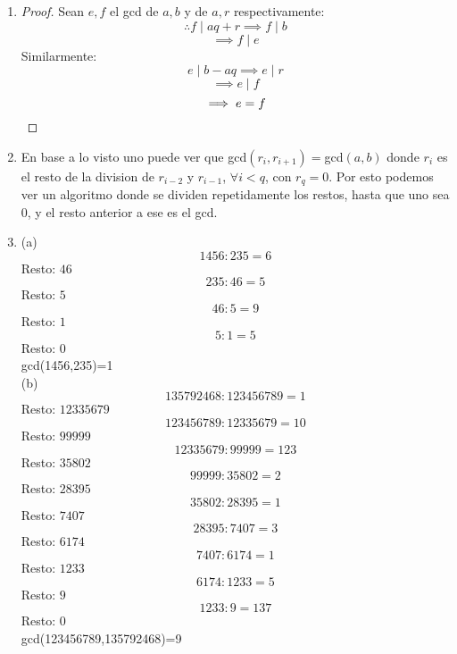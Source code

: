 \documentclass[11pt]{article}
\theoremstyle{definition}
\begin{document}
        \begin{enumerate}[label=\textbf{(\alph*)}]
            \item \begin{proof}
                Sean $e,f$ el gcd de $a,b$ y de $a,r$ respectivamente:
                \[\therefore f\mid aq+r\implies f\mid b\]
                \[\implies f\mid e\]
                Similarmente:
                \[e\mid b-aq\implies e\mid r\]
                \[\implies e\mid f\]
                \[\implies e=f\qedhere\]
            \end{proof}

            \item En base a lo visto uno puede ver que gcd$(r_i,r_{i+1})=$gcd$(a,b)$ donde $r_i$ es el resto de la division de $r_{i-2}$ y $r_{i-1}$, $\forall i< q$, con $r_q=0$. Por esto podemos ver un algoritmo donde se dividen repetidamente los restos, hasta que uno sea 0, y el resto anterior a ese es el gcd.

            \item
            (a)
            \[ 1456 : 235 = 6 \]
            Resto: $ 46 $
            \[ 235 : 46 = 5 \]
            Resto: $ 5 $
            \[ 46 : 5 = 9 \]
            Resto: $ 1 $
            \[ 5 : 1 = 5 \]
            Resto: $ 0 $\\
            gcd(1456,235)=1\\
            (b)
            \[ 135792468 : 123456789 = 1 \]
            Resto: $ 12335679 $
            \[ 123456789 : 12335679 = 10 \]
            Resto: $ 99999 $
            \[ 12335679 : 99999 = 123 \]
            Resto: $ 35802 $
            \[ 99999 : 35802 = 2 \]
            Resto: $ 28395 $
            \[ 35802 : 28395 = 1 \]
            Resto: $ 7407 $
            \[ 28395 : 7407 = 3 \]
            Resto: $ 6174 $
            \[ 7407 : 6174 = 1 \]
            Resto: $ 1233 $
            \[ 6174 : 1233 = 5 \]
            Resto: $ 9 $
            \[ 1233 : 9 = 137 \]
            Resto: $ 0 $\\
            gcd(123456789,135792468)=9
        \end{enumerate}
\end{document}
